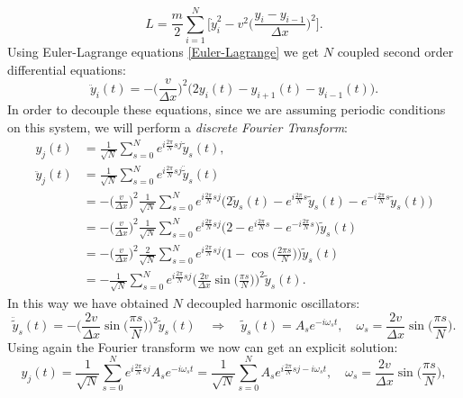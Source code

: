 \begin{equation*}
    L=\frac{m}{2}\sum_{i=1}^{N}\bigg[\dot y_i^2-v^2\bigg(\frac{y_i-y_{i-1}}{\Delta x}\bigg)^2\bigg].
\end{equation*}
Using Euler-Lagrange equations \eqref{Euler-Lagrange} we get $N$ coupled second order differential equations:
\begin{equation*}
    \ddot y_i(t)=-\bigg(\frac{v}{\Delta x}\bigg)^2\big(2y_i(t)-y_{i+1}(t)-y_{i-1}(t)\big).
\end{equation*}
In order to decouple these equations, since we are assuming periodic conditions on this system, we will perform a \emph{discrete Fourier Transform}: 
\begin{align*}
    y_j(t)&=\frac{1}{\sqrt{N}}\sum_{s=0}^{N}e^{i\frac{2\pi}{N}sj} \tilde{y}_s(t),\\
    \ddot y_j(t)&=\frac{1}{\sqrt{N}}\sum_{s=0}^{N}e^{i\frac{2\pi}{N}sj} \ddot{\tilde{y}}_s(t)\\&=-\bigg(\frac{v}{\Delta x}\bigg)^2\frac{1}{\sqrt{N}}\sum_{s=0}^{N}e^{i\frac{2\pi}{N}sj}\big(2\tilde y_s(t)-e^{i\frac{2\pi}{N}s}\tilde y_{s}(t)-e^{-i\frac{2\pi}{N}s}\tilde y_{s}(t)\big)\\&=-\bigg(\frac{v}{\Delta x}\bigg)^2\frac{1}{\sqrt{N}}\sum_{s=0}^{N}e^{i\frac{2\pi}{N}sj}\big(2-e^{i\frac{2\pi}{N}s}-e^{-i\frac{2\pi}{N}s}\big)\tilde y_{s}(t)\\&=-\bigg(\frac{v}{\Delta x}\bigg)^2\frac{2}{\sqrt{N}}\sum_{s=0}^{N}e^{i\frac{2\pi}{N}sj}\bigg(1-\cos\bigg(\frac{2\pi s}{N}\bigg)\bigg)\tilde y_{s}(t)\\&=-\frac{1}{\sqrt{N}}\sum_{s=0}^{N}e^{i\frac{2\pi}{N}sj}\bigg(\frac{2v}{\Delta x}\sin\bigg(\frac{\pi s}{N}\bigg)\bigg)^2\tilde y_{s}(t).
\end{align*}
In this way we have obtained $N$ decoupled harmonic oscillators:
\begin{equation*}
    \ddot{\tilde{y}}_s(t)=-\bigg(\frac{2v}{\Delta x}\sin\bigg(\frac{\pi s}{N}\bigg)\bigg)^2\tilde y_{s}(t)\quad\Rightarrow\quad \tilde{y}_s(t)=A_s e^{-i\omega_st},\quad\omega_s=\frac{2v}{\Delta x}\sin\bigg(\frac{\pi s}{N}\bigg).
\end{equation*}
Using again the Fourier transform we now can get an explicit solution:
\begin{equation*}
    y_j(t)=\frac{1}{\sqrt{N}}\sum_{s=0}^{N}e^{i\frac{2\pi}{N}sj}A_s e^{-i\omega_st}=\frac{1}{\sqrt{N}}\sum_{s=0}^{N}A_s e^{i\frac{2\pi}{N}sj-i\omega_st},\quad\omega_s=\frac{2v}{\Delta x}\sin\bigg(\frac{\pi s}{N}\bigg),
\end{equation*}
